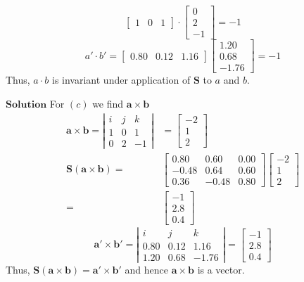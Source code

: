\documentclass{article}
\begin{document}
\begin{flushleft}
$$\begin{bmatrix}
1 & 0 & 1
\end{bmatrix} \cdot\begin{bmatrix}
0 \\
2 \\
-1
\end{bmatrix}=-1
$$
$$
a' \cdot b'=\begin{bmatrix}
0.80 & 0.12 & 1.16
\end{bmatrix}\begin{bmatrix}
1.20 \\
0.68 \\
-1.76
\end{bmatrix}=-1
$$
Thus, $a \cdot b$ is invariant under application of $\mathbf{S}$ to $a$ and $b$.

$\boxed{\textbf{Solution}}$ For $(c)$ we find $\mathbf{a} \times \mathbf{b}$
$$
\begin{aligned}
\mathbf{a} \times \mathbf{b}=\left|\begin{array}{ccc}
i & j & k \\
1 & 0 & 1 \\
0 & 2 & -1
\end{array}\right| &=\begin{bmatrix}
-2 \\
1 \\
2
\end{bmatrix} \\
\mathbf{S}(\mathbf{a} \times \mathbf{b})=&\begin{bmatrix}
0.80 & 0.60 & 0.00 \\
-0.48 & 0.64 & 0.60 \\
0.36 & -0.48 & 0.80
\end{bmatrix}\begin{bmatrix}
-2 \\
1 \\
2
\end{bmatrix} \\
=&\begin{bmatrix}
-1 \\
2.8 \\
0.4
\end{bmatrix}
\end{aligned}
$$
$$
\mathbf{a}' \times \mathbf{b}'=\left|\begin{array}{ccc}
i & j & k \\
0.80 & 0.12 & 1.16 \\
1.20 & 0.68 & -1.76
\end{array}\right|=\begin{bmatrix}
-1 \\
2.8 \\
0.4
\end{bmatrix}
$$
Thus, $\mathbf{S}(\mathbf{a} \times \mathbf{b})=\mathbf{a}' \times \mathbf{b}'$ and hence $\mathbf{a} \times \mathbf{b}$ is a vector.







\end{flushleft}
\end{document}
